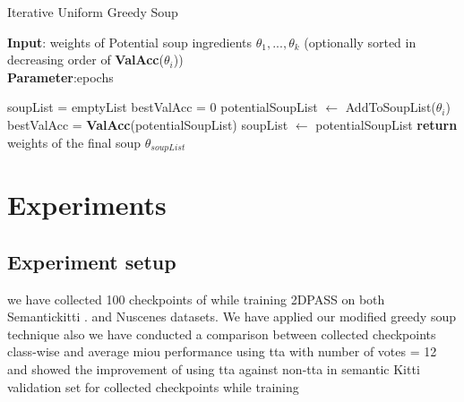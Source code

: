 \documentclass[10pt,twocolumn,letterpaper]{article}
\begin{document}
\begin{algorithm}[!h]
\caption{Iterative Uniform Greedy Soup}
\label{alg:algorithm}
\textbf{Input}: weights of Potential soup ingredients ${\theta_1, ..., \theta_k}$ (optionally sorted in decreasing order of \textbf{ValAcc}($\theta_i$))\\
\textbf{Parameter}:epochs\\
\begin{algorithmic}[1] %
\STATE soupList = emptyList
\STATE bestValAcc = 0
\STATE potentialSoupList $\leftarrow$ AddToSoupList($\theta_i$)
\STATE bestValAcc = \textbf{ValAcc}(potentialSoupList)
\STATE soupList $\leftarrow$ potentialSoupList
\ENDIF
\ENDFOR
\ENDFOR
\STATE \textbf{return} weights of the final soup $\theta_{soupList}$
\end{algorithmic}
\end{algorithm}
\section{Experiments}
\subsection{Experiment setup}
we have collected 100 checkpoints of while training 2DPASS \cite{yan20222dpass} on both  Semantickitti \cite{behley2019semantickitti}. and Nuscenes \cite{caesar2020nuscenes}  datasets.
We have applied our modified greedy soup technique
also we have conducted a comparison between collected checkpoints  class-wise and average miou performance using tta with number of votes = 12 and showed the improvement of using tta against non-tta in semantic Kitti validation set for collected checkpoints while training   
\end{document}
